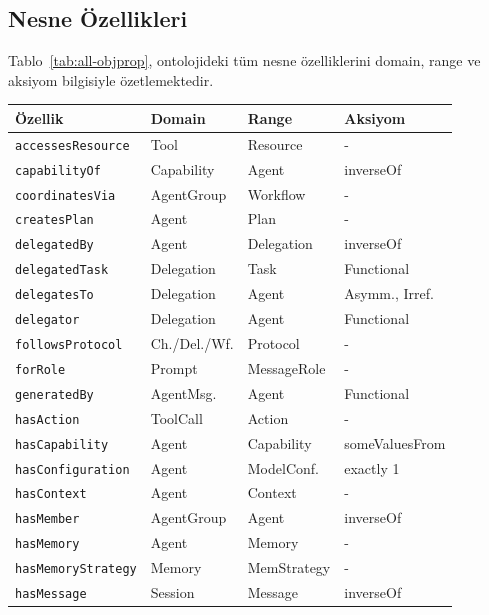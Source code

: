 \documentclass[10pt, a4paper, twocolumn]{article}
\begin{document}
\subsection{Nesne Özellikleri}

Tablo~\ref{tab:all-objprop}, ontolojideki tüm nesne özelliklerini domain, range ve aksiyom bilgisiyle özetlemektedir.

\begin{center}
\tiny
\begin{tabular}{|p{2.1cm}|p{1.4cm}|p{1.4cm}|p{1.5cm}|}
\hline
\textbf{Özellik} & \textbf{Domain} & \textbf{Range} & \textbf{Aksiyom} \\
\hline
\texttt{accessesResource} & Tool & Resource & {-} \\
\hline
\texttt{capabilityOf} & Capability & Agent & inverseOf \\
\hline
\texttt{coordinatesVia} & AgentGroup & Workflow & {-} \\
\hline
\texttt{createsPlan} & Agent & Plan & {-} \\
\hline
\texttt{delegatedBy} & Agent & Delegation & inverseOf \\
\hline
\texttt{delegatedTask} & Delegation & Task & Functional \\
\hline
\texttt{delegatesTo} & Delegation & Agent & Asymm., Irref. \\
\hline
\texttt{delegator} & Delegation & Agent & Functional \\
\hline
\texttt{followsProtocol} & Ch./Del./Wf. & Protocol & {-} \\
\hline
\texttt{forRole} & Prompt & MessageRole & {-} \\
\hline
\texttt{generatedBy} & AgentMsg. & Agent & Functional \\
\hline
\texttt{hasAction} & ToolCall & Action & {-} \\
\hline
\texttt{hasCapability} & Agent & Capability & someValuesFrom \\
\hline
\texttt{hasConfiguration} & Agent & ModelConf. & exactly 1 \\
\hline
\texttt{hasContext} & Agent & Context & {-} \\
\hline
\texttt{hasMember} & AgentGroup & Agent & inverseOf \\
\hline
\texttt{hasMemory} & Agent & Memory & {-} \\
\hline
\texttt{hasMemoryStrategy} & Memory & MemStrategy & {-} \\
\hline
\texttt{hasMessage} & Session & Message & inverseOf \\

\end{tabular}
\end{center}
\end{document}
